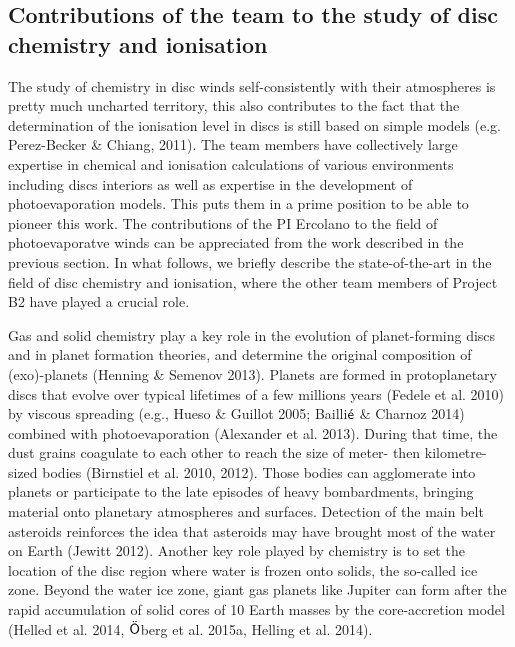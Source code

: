\documentclass[10pt,fleqn,twoside]{article}
\begin{document}
\subsection{Contributions of the team to the study of disc chemistry and ionisation}
The study of chemistry in disc winds self-consistently with their
atmospheres is pretty much uncharted territory, this also contributes
to the fact that the determination of the ionisation level in discs is
still based on simple models (e.g. Perez-Becker \& Chiang, 2011). The
team members have collectively large expertise in chemical and ionisation
calculations of various environments including discs interiors as well
as expertise in the development of photoevaporation models. This puts
them in a prime position to be able to pioneer this work. The
contributions of the PI Ercolano to the field of photoevaporatve winds
can be appreciated from the work described in the previous section. In what
follows, we briefly describe the state-of-the-art in the field of disc
chemistry and ionisation, where the other team members of Project B2 have played
a crucial role.  


Gas and solid chemistry play a key role in the evolution of planet-forming discs and in planet formation theories, and determine the original composition of (exo)-planets (Henning \& Semenov 2013).  Planets are formed in protoplanetary discs that evolve over typical lifetimes of a few millions years (Fedele et al. 2010) by viscous spreading (e.g., Hueso \& Guillot 2005; Bailli$\acute{\textsf e}$ \& Charnoz 2014) combined with photoevaporation (Alexander et al. 2013). During that time, the dust grains coagulate to each other to reach the size of meter- then kilometre- sized bodies (Birnstiel et al. 2010, 2012). Those bodies can agglomerate into planets or participate to the late episodes of heavy bombardments, bringing material onto planetary atmospheres and surfaces. Detection of the main belt asteroids reinforces the idea that asteroids may have brought most of the water on Earth (Jewitt 2012). Another key role played by chemistry is to set the location of the disc region where water is frozen onto solids, the so-called ice zone. Beyond the water ice zone, giant gas planets like Jupiter can form after the rapid accumulation of solid cores of 10 Earth masses by the core-accretion model (Helled et al. 2014, $\ddot{\textsf O}$berg et al. 2015a, Helling et al. 2014).
\end{document}

